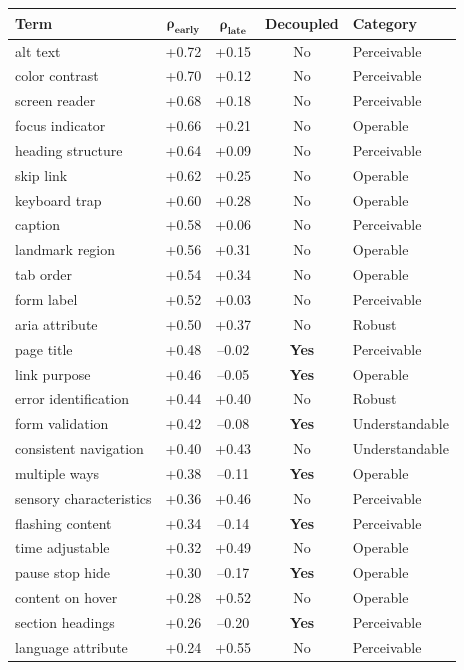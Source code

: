 \documentclass[10pt]{article} %
\begin{document}
\begin{table}[H]
\centering
\scriptsize
\begin{tabular}{|l|c|c|c|l|}
\hline
\textbf{Term} & $\mathbf{\rho_\text{early}}$ & $\mathbf{\rho_\text{late}}$ & \textbf{Decoupled} & \textbf{Category} \\
\hline
alt text & +0.72 & +0.15 & No & Perceivable \\
color contrast & +0.70 & +0.12 & No & Perceivable \\
screen reader & +0.68 & +0.18 & No & Perceivable \\
focus indicator & +0.66 & +0.21 & No & Operable \\
heading structure & +0.64 & +0.09 & No & Perceivable \\
skip link & +0.62 & +0.25 & No & Operable \\
keyboard trap & +0.60 & +0.28 & No & Operable \\
caption & +0.58 & +0.06 & No & Perceivable \\
landmark region & +0.56 & +0.31 & No & Operable \\
tab order & +0.54 & +0.34 & No & Operable \\
form label & +0.52 & +0.03 & No & Perceivable \\
aria attribute & +0.50 & +0.37 & No & Robust \\
page title & +0.48 & --0.02 & \textbf{Yes} & Perceivable \\
link purpose & +0.46 & --0.05 & \textbf{Yes} & Operable \\
error identification & +0.44 & +0.40 & No & Robust \\
form validation & +0.42 & --0.08 & \textbf{Yes} & Understandable \\
consistent navigation & +0.40 & +0.43 & No & Understandable \\
multiple ways & +0.38 & --0.11 & \textbf{Yes} & Operable \\
sensory characteristics & +0.36 & +0.46 & No & Perceivable \\
flashing content & +0.34 & --0.14 & \textbf{Yes} & Perceivable \\
time adjustable & +0.32 & +0.49 & No & Operable \\
pause stop hide & +0.30 & --0.17 & \textbf{Yes} & Operable \\
content on hover & +0.28 & +0.52 & No & Operable \\
section headings & +0.26 & --0.20 & \textbf{Yes} & Perceivable \\
language attribute & +0.24 & +0.55 & No & Perceivable \\

\end{tabular}
\end{table}
\end{document}
